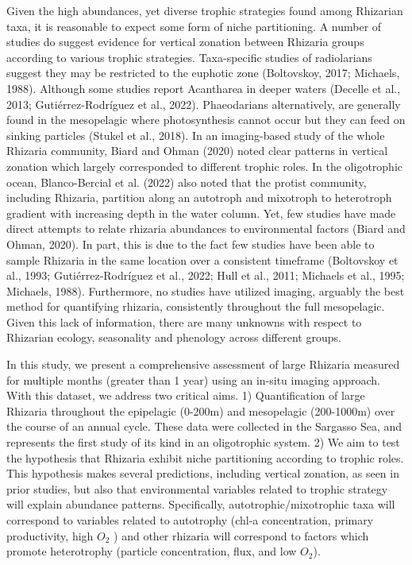\documentclass[
]{article}
\begin{document}
Given the high abundances, yet diverse trophic strategies found among
Rhizarian taxa, it is reasonable to expect some form of niche
partitioning. A number of studies do suggest evidence for vertical
zonation between Rhizaria groups according to various trophic
strategies. Taxa-specific studies of radiolarians suggest they may be
restricted to the euphotic zone (Boltovskoy, 2017; Michaels, 1988).
Although some studies report Acantharea in deeper waters (Decelle et
al., 2013; Gutiérrez-Rodríguez et al., 2022). Phaeodarians
alternatively, are generally found in the mesopelagic where
photosynthesis cannot occur but they can feed on sinking particles
(Stukel et al., 2018). In an imaging-based study of the whole Rhizaria
community, Biard and Ohman (2020) noted clear patterns in vertical
zonation which largely corresponded to different trophic roles. In the
oligotrophic ocean, Blanco-Bercial et al. (2022) also noted that the
protist community, including Rhizaria, partition along an autotroph and
mixotroph to heterotroph gradient with increasing depth in the water
column. Yet, few studies have made direct attempts to relate rhizaria
abundances to environmental factors (Biard and Ohman, 2020). In part,
this is due to the fact few studies have been able to sample Rhizaria in
the same location over a consistent timeframe (Boltovskoy et al., 1993;
Gutiérrez-Rodríguez et al., 2022; Hull et al., 2011; Michaels et al.,
1995; Michaels, 1988). Furthermore, no studies have utilized imaging,
arguably the best method for quantifying rhizaria, consistently
throughout the full mesopelagic. Given this lack of information, there
are many unknowns with respect to Rhizarian ecology, seasonality and
phenology across different groups.

In this study, we present a comprehensive assessment of large Rhizaria
measured for multiple months (greater than 1 year) using an in-situ
imaging approach. With this dataset, we address two critical aims. 1)
Quantification of large Rhizaria throughout the epipelagic (0-200m) and
mesopelagic (200-1000m) over the course of an annual cycle. These data
were collected in the Sargasso Sea, and represents the first study of
its kind in an oligotrophic system. 2) We aim to test the hypothesis
that Rhizaria exhibit niche partitioning according to trophic roles.
This hypothesis makes several predictions, including vertical zonation,
as seen in prior studies, but also that environmental variables related
to trophic strategy will explain abundance patterns. Specifically,
autotrophic/mixotrophic taxa will correspond to variables related to
autotrophy (chl-a concentration, primary productivity, high \(O_2\) )
and other rhizaria will correspond to factors which promote heterotrophy
(particle concentration, flux, and low \(O_2\)).
\end{document}
